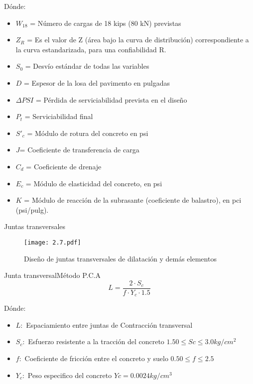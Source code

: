 \begin{frame}{Dónde:}
\begin{itemize}
	\item \(W_{18}\) = Número de cargas de 18 kips (80 kN) previstas 
	\item \(Z_{R} \) = Es el valor de Z (área bajo la curva de distribución) correspondiente a la curva estandarizada, para una confiabilidad R.
	\item \(S_{0} \) = Desvío estándar de todas las variables
	\item \(D\) = Espesor de la losa del pavimento en pulgadas 
	\item \(\Delta PSI\) = Pérdida de serviciabilidad prevista en el diseño
	\item \(P_{t}\) = Serviciabilidad final
	\item \(S'_{c}\) = Módulo de rotura del concreto en psi
	\item \(J \)= Coeficiente de transferencia de carga
	\item \(C_{d}\) = Coeficiente de drenaje
	\item \(E_{c} \) = Módulo de elasticidad del concreto, en psi
	\item \(K \) = Módulo de reacción de la subrasante (coeficiente de balastro), en pci (psi/pulg).
\end{itemize}
\end{frame}
\begin{frame}{Juntas transversales}
	\begin{figure}[h]
	\captionsetup{width=1\textwidth}
	\centering
	\texttt{[image: 2.7.pdf]}
	\caption[Descripcion corta]{Diseño de juntas transversales de dilatación y demás elementos }
	\label{fig:etiqueta}
	\end{figure}
\end{frame}
\begin{frame}{Junta transversal}{Método P.C.A}
	\begin{equation}
		L = \frac{2 \cdot S_{c}}{f \cdot Y_{c} \cdot 1.5 }
	\end{equation}
	\begin{block}{Dónde:}
		\begin{itemize}
			\item \(L : \) Espaciamiento entre juntas de Contracción transversal
			\item \(S_{c} : \) Esfuerzo resistente a la tracción del concreto \(1.50 \leq Sc \leq 3.0 kg/cm^{2}\)
			\item \(f :\) Coeficiente de fricción entre el concreto y suelo \(0.50 \leq f \leq 2.5\)
			\item \(Y_{c} :\) Peso especifico del concreto \(Yc= 0.0024 kg/cm^{3}\)
		\end{itemize}
	\end{block}
\end{frame}
